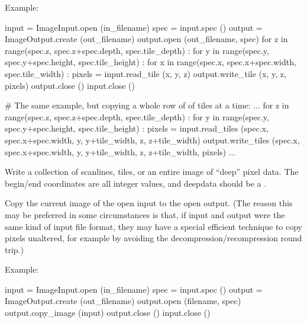 \noindent Example:
\begin{code}
    input = ImageInput.open (in_filename)
    spec = input.spec ()
    output = ImageOutput.create (out_filename)
    output.open (out_filename, spec)
    for z in range(spec.z, spec.z+spec.depth, spec.tile_depth) :
        for y in range(spec.y, spec.y+spec.height, spec.tile_height) :
            for x in range(spec.x, spec.x+spec.width, spec.tile_width) :
                pixels = input.read_tile (x, y, z)
                output.write_tile (x, y, z, pixels)
    output.close ()
    input.close ()

    # The same example, but copying a whole row of of tiles at a time:
    ...
    for z in range(spec.z, spec.z+spec.depth, spec.tile_depth) :
        for y in range(spec.y, spec.y+spec.height, spec.tile_height) :
            pixels = input.read_tiles (spec.x, spec.x+spec.width,
                                       y, y+tile_width, z, z+tile_width)
            output.write_tiles (spec.x, spec.x+spec.width,
                                y, y+tile_width, z, z+tile_width, pixels)
    ...
\end{code}
\apiend


Write a collection of scanlines, tiles, or an entire image of ``deep''
pixel data. The begin/end coordinates are all integer values, and
{\cf deepdata} should be a \DeepData.
\apiend

Copy the current image of the open input to the open output. (The reason
this may be preferred in some circumstances is that, if input and
output were the same kind of input file format, they may have a special
efficient technique to copy pixels unaltered, for example by avoiding the 
decompression/recompression round trip.)

\noindent Example:
\begin{code}
    input = ImageInput.open (in_filename)
    spec = input.spec ()
    output = ImageOutput.create (out_filename)
    output.open (filename, spec)
    output.copy_image (input)
    output.close ()
    input.close ()
\end{code}
\apiend


